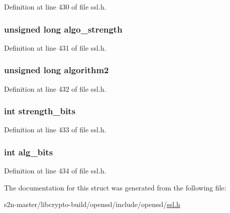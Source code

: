 Definition at line 430 of file ssl.\+h.

\subsubsection[{\texorpdfstring{algo\+\_\+strength}{algo_strength}}]{\setlength{\rightskip}{0pt plus 5cm}unsigned long algo\+\_\+strength}\hypertarget{structssl__cipher__st_ac8b0d65d4922f2af4cbb506b0302429b}{}\label{structssl__cipher__st_ac8b0d65d4922f2af4cbb506b0302429b}


Definition at line 431 of file ssl.\+h.

\subsubsection[{\texorpdfstring{algorithm2}{algorithm2}}]{\setlength{\rightskip}{0pt plus 5cm}unsigned long algorithm2}\hypertarget{structssl__cipher__st_aa1bc3c7504b2b9a1c0d2a8d051da6a4c}{}\label{structssl__cipher__st_aa1bc3c7504b2b9a1c0d2a8d051da6a4c}


Definition at line 432 of file ssl.\+h.

\subsubsection[{\texorpdfstring{strength\+\_\+bits}{strength_bits}}]{\setlength{\rightskip}{0pt plus 5cm}int strength\+\_\+bits}\hypertarget{structssl__cipher__st_acfde445d8939bd98550e9b431a125828}{}\label{structssl__cipher__st_acfde445d8939bd98550e9b431a125828}


Definition at line 433 of file ssl.\+h.

\subsubsection[{\texorpdfstring{alg\+\_\+bits}{alg_bits}}]{\setlength{\rightskip}{0pt plus 5cm}int alg\+\_\+bits}\hypertarget{structssl__cipher__st_ad86d30d946b2626d2ea32dc374029ceb}{}\label{structssl__cipher__st_ad86d30d946b2626d2ea32dc374029ceb}


Definition at line 434 of file ssl.\+h.



The documentation for this struct was generated from the following file\+:\begin{DoxyCompactItemize}
\item 
s2n-\/master/libcrypto-\/build/openssl/include/openssl/\hyperlink{include_2openssl_2ssl_8h}{ssl.\+h}\end{DoxyCompactItemize}
